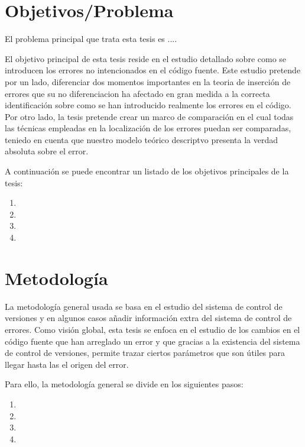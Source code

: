 \documentclass[a4paper, 12pt]{book}
\begin{document}
\section{Objetivos/Problema}
El problema principal que trata esta tesis es ....

El objetivo principal de esta tesis reside en el estudio detallado sobre como se introducen los errores no intencionados en el c\'odigo fuente. Este estudio pretende por un lado, diferenciar dos momentos importantes en la teoria de inserci\'on de errores que su no diferenciacion ha afectado en gran medida a la correcta identificaci\'on sobre como se han introducido realmente los errores en el c\'odigo. Por otro lado, la tesis pretende crear un marco de comparaci\'on en el cual todas las t\'ecnicas empleadas en la localizaci\'on de los errores puedan ser comparadas, teniedo en cuenta que nuestro modelo te\'orico descriptvo presenta la verdad absoluta sobre el error.

A continuaci\'on se puede encontrar un listado de los objetivos principales de la tesis:

\begin{enumerate}
  \item{}
  \item{}
  \item{}
  \item{}
\end{enumerate}

\section{Metodolog\'ia}
La metodolog\'ia general usada se basa en el estudio del sistema de control de versiones y en algunos casos a\~nadir informaci\'on extra del sistema de control de errores. Como visi\'on global, esta tesis se enfoca en el estudio de los cambios en el c\'odigo fuente que han arreglado un error y que gracias a la existencia del sistema de control de versiones, permite trazar ciertos par\'ametros que son \'utiles para llegar hasta las el origen del error.

Para ello, la metodolog\'ia general se divide en los siguientes pasos:

\begin{enumerate}
  \item{}
  \item{}
  \item{}
  \item{}
\end{enumerate}
\end{document}
